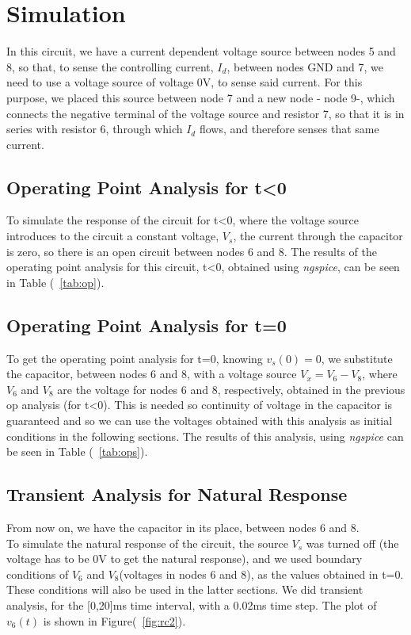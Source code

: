 \section{Simulation}
\label{sec:simulation}
In this circuit, we have a current dependent voltage source between nodes 5 and 8, so that, to sense the controlling current, $I_d$, between nodes GND and 7, we need to use a voltage source of voltage 0V, to sense said current. For this purpose, we placed this source between node 7 and a new node - node 9-, which connects the negative terminal of the voltage source and resistor 7, so that it is in series with resistor 6, through which $I_d$ flows, and therefore senses that same current.\\
\subsection{Operating Point Analysis for t\textless0}
To simulate the response of the circuit for t\textless0, where the voltage source introduces to the circuit a constant voltage, $V_s$, the current through the capacitor is zero, so there is an open circuit between nodes 6 and 8. The results of the operating point analysis for this circuit, t\textless0, obtained using \textit{ngspice}, can be seen in Table (~\ref{tab:op}).\\

\subsection{Operating Point Analysis for t=0}
To get the operating point analysis for t=0, knowing $v_s(0)=0$, we substitute the capacitor, between nodes 6 and 8, with a voltage source $V_x=V_6-V_8$, where $V_6$ and $V_8$ are the voltage for nodes 6 and 8, respectively, obtained in the previous op analysis (for t\textless0). This is needed so continuity of voltage in the capacitor is guaranteed and so we can use the voltages obtained with this analysis as initial conditions in the following sections. The results of this analysis, using \textit{ngspice} can be seen in Table (~\ref{tab:ops}).\\
\subsection{Transient Analysis for Natural Response}
From now on, we have the capacitor in its place, between nodes 6 and 8.\\
To simulate the natural response of the circuit, the source $V_s$ was turned off (the voltage has to be 0V to get the natural response), and we used boundary conditions of $V_6$ and $V_8$(voltages in nodes 6 and 8), as the values obtained in t=0. These conditions will also be used in the latter sections. We did transient analysis, for the [0,20]ms time interval, with a 0.02ms time step. The plot of $v_{6}(t)$ is shown in Figure(~\ref{fig:rc2}).\\

